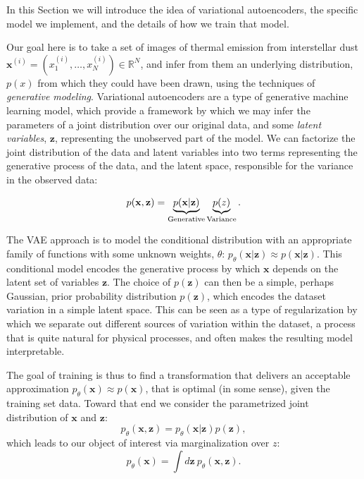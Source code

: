 \documentclass[fleqn,usenatbib]{mnras}
\begin{document}
In this Section we will introduce the idea of variational autoencoders, the specific model we implement, and the details of how we train that model.

Our goal here is to take a set of images of thermal emission from interstellar dust $\mathbf{x}^{(i)} = (x_1^{(i)}, \dots, x_N^{(i)}) \in \mathbb{R}^N$, and infer from them an underlying distribution, $p(x)$ from which they could have been drawn, using the techniques of \emph{generative modeling}. Variational autoencoders are a type of generative machine learning model, which provide a framework by which we may infer the parameters of a joint distribution over our original data, and some \emph{latent variables}, $\mathbf z$, representing the unobserved part of the model. We can factorize the joint distribution of the data and latent variables into two terms representing the generative process of the data, and the latent space, responsible for the variance in the observed data:

\begin{equation}
    p(\mathbf x,\mathbf z) = \underbrace{p(\mathbf x|\mathbf z)}_{{\rm Generative}}\underbrace{p(z)}_{{\rm Variance}}.
\end{equation}

The VAE approach is to model the conditional distribution with an appropriate family of functions with some unknown weights, $\theta$: $p_\theta(\mathbf x | \mathbf z) \approx p(\mathbf x | \mathbf z)$. This conditional model encodes the generative process by which  $\mathbf{x}$ depends on the latent set of variables $\mathbf{z}$. The choice of $p(\mathbf z)$ can then be a simple, perhaps Gaussian, prior probability distribution $p(\mathbf z)$, which encodes the dataset variation in a simple latent space. This can be seen as a type of regularization by which we separate out different sources of variation within the dataset, a process that is quite natural for physical processes, and often makes the resulting model interpretable. 

The goal of training is thus to find a transformation that delivers an acceptable approximation $p_\theta(\mathbf x) \approx p(\mathbf x)$,  that is optimal (in some sense), given the training set data. Toward that end we consider the parametrized joint distribution of $\mathbf x$ and $\mathbf z$: 
\begin{equation}
    p_\theta(\mathbf x,\mathbf z) = p_\theta(\mathbf x|\mathbf z)p(\mathbf z),
\end{equation}
which leads to our object of interest via marginalization over $z$:
\begin{equation}
\label{eq:likelihood}
    p_\theta(\mathbf x) = \int d\mathbf z~ p_\theta(\mathbf x, \mathbf z).
\end{equation}
\end{document}
